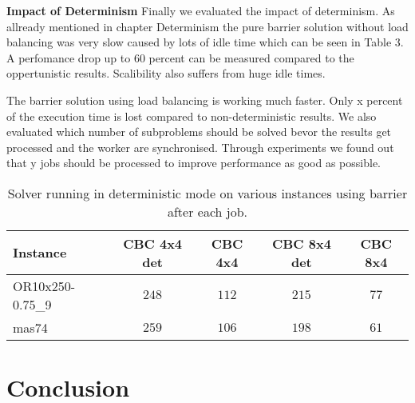 \documentclass[sigconf]{acmart}
\begin{document}
\textbf{Impact of Determinism}
Finally we evaluated the impact of determinism. As allready mentioned in chapter Determinism the pure barrier solution without load balancing was very slow caused by lots of idle time which can be seen in Table 3. A perfomance drop up to 60 percent can be measured compared to the oppertunistic results. Scalibility also suffers from huge idle times.

The barrier solution using load balancing is working much faster. Only x percent of the execution time is lost compared to non-deterministic results. We also evaluated which number of subproblems should be solved bevor the results get processed and the worker are synchronised. Through experiments we found out that y jobs should be processed to improve performance as good as possible.

\begin{table}
\caption{Solver running in deterministic mode on various instances using barrier after each job.}

\begin{tabular}{|l || c | c | c | c |} 
 \hline
 Instance & CBC 4x4 det & CBC 4x4 & CBC 8x4 det & CBC 8x4 \\  
 \hline
 OR10x250-0.75\_9 & $248$& $112$ & $215$& $77$\\
 \hline
 mas74 & $259$& $106$& $198$& $61$\\
 \hline
\end{tabular}
\end{table}

\section{Conclusion}



\end{document}
